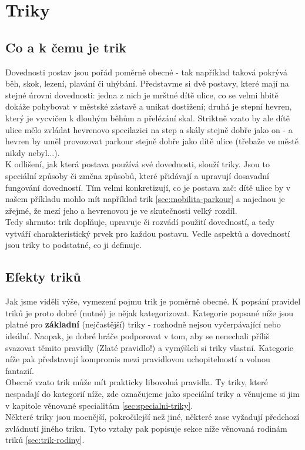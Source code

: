 \chapter{Triky}
\label{chap:triky}

\section{Co a k čemu je trik}
\label{sec:coakcemu-trik}
Dovednosti postav jsou pořád poměrně obecné - tak například taková  pokrývá běh, skok, lezení, plavání či uhýbání. Představme si dvě postavy, které mají  na stejné úrovni dovednosti: jedna z nich je mrštné dítě ulice, co se velmi hbitě dokáže pohybovat v městské zástavě a unikat dostižení; druhá je stepní hevren, který je vycvičen k dlouhým běhům a přelézání skal. Striktně vzato by ale dítě ulice mělo zvládat hevrenovo specilazici na step a skály stejně dobře jako on - a hevren by uměl provozovat parkour stejně dobře jako dítě ulice (třebaže ve městě nikdy nebyl...).\\
K odlišení, jak která postava používá své dovednosti, slouží triky. Jsou to speciální způsoby či změna způsobů, které přidávají a upravují dosavadní fungování dovedností. Tím velmi konkretizují, co je postava zač: dítě ulice by v našem příkladu mohlo mít například trik  \ref{sec:mobilita-parkour} a najednou je zřejmé, že mezí jeho a hevrenovou  je ve skutečnosti velký rozdíl.\\
Tedy shrnuto: trik doplňuje, upravuje či rozvádí použití dovedností, a tedy vytváří charakteristický prvek pro každou postavu. Vedle aspektů a dovedností jsou triky to podstatné, co ji definuje.


\section{Efekty triků}
\label{sec:trik-efekty}
Jak jsme viděli výše, vymezení pojmu trik je poměrně obecné. K popsání pravidel triků je proto dobré (nutné) je nějak kategorizovat. Kategorie popsané níže jsou platné pro \textbf{základní} (nejčastější) triky - rozhodně nejsou vyčerpávající nebo ideální. Naopak, je dobré hráče podporovat v tom, aby se nenechali příliš svazovat těmito pravidly (Zlaté pravidlo!) a vymýšleli si triky vlastní. Kategorie níže pak představují kompromis mezi pravidlovou uchopitelností a volnou fantazií.\\
Obecně vzato trik může mít prakticky libovolná pravidla. Ty triky, které nespadají do kategorií níže, zde označujeme jako speciální triky a věnujeme si jim v kapitole věnované specialitám \ref{sec:specialni-triky}.\\
Některé triky jsou mocnější, pokročilejší než jiné, některé zase vyžadují předchozí zvládnutí jiného triku. Tyto vztahy pak popisuje sekce níže věnovaná rodinám triků \ref{sec:trik-rodiny}. 

